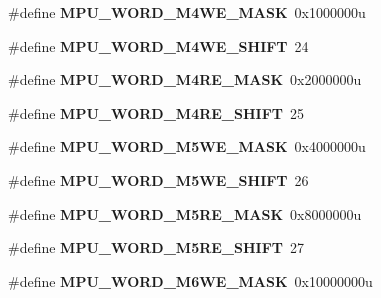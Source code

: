 \begin{DoxyCompactItemize}
\item 
\#define {\bfseries M\+P\+U\+\_\+\+W\+O\+R\+D\+\_\+\+M4\+W\+E\+\_\+\+M\+A\+SK}~0x1000000u\hypertarget{group__MPU__Register__Masks_gac3a983687d94df3019c562fa26c8d07e}{}\label{group__MPU__Register__Masks_gac3a983687d94df3019c562fa26c8d07e}

\item 
\#define {\bfseries M\+P\+U\+\_\+\+W\+O\+R\+D\+\_\+\+M4\+W\+E\+\_\+\+S\+H\+I\+FT}~24\hypertarget{group__MPU__Register__Masks_gaa32f6731588dff2a7e5ee20e10a86937}{}\label{group__MPU__Register__Masks_gaa32f6731588dff2a7e5ee20e10a86937}

\item 
\#define {\bfseries M\+P\+U\+\_\+\+W\+O\+R\+D\+\_\+\+M4\+R\+E\+\_\+\+M\+A\+SK}~0x2000000u\hypertarget{group__MPU__Register__Masks_ga529413212f8c7cf7bd2d1ab6a050d1c8}{}\label{group__MPU__Register__Masks_ga529413212f8c7cf7bd2d1ab6a050d1c8}

\item 
\#define {\bfseries M\+P\+U\+\_\+\+W\+O\+R\+D\+\_\+\+M4\+R\+E\+\_\+\+S\+H\+I\+FT}~25\hypertarget{group__MPU__Register__Masks_ga72594f986e13433ed74e6eabfacf5253}{}\label{group__MPU__Register__Masks_ga72594f986e13433ed74e6eabfacf5253}

\item 
\#define {\bfseries M\+P\+U\+\_\+\+W\+O\+R\+D\+\_\+\+M5\+W\+E\+\_\+\+M\+A\+SK}~0x4000000u\hypertarget{group__MPU__Register__Masks_ga918f8ced0f8de1a54cc59c57328a18f3}{}\label{group__MPU__Register__Masks_ga918f8ced0f8de1a54cc59c57328a18f3}

\item 
\#define {\bfseries M\+P\+U\+\_\+\+W\+O\+R\+D\+\_\+\+M5\+W\+E\+\_\+\+S\+H\+I\+FT}~26\hypertarget{group__MPU__Register__Masks_gaa25703033160cedcbc90416722c87fc9}{}\label{group__MPU__Register__Masks_gaa25703033160cedcbc90416722c87fc9}

\item 
\#define {\bfseries M\+P\+U\+\_\+\+W\+O\+R\+D\+\_\+\+M5\+R\+E\+\_\+\+M\+A\+SK}~0x8000000u\hypertarget{group__MPU__Register__Masks_ga04e6c19c601a7bd3dd87a889f309a9f4}{}\label{group__MPU__Register__Masks_ga04e6c19c601a7bd3dd87a889f309a9f4}

\item 
\#define {\bfseries M\+P\+U\+\_\+\+W\+O\+R\+D\+\_\+\+M5\+R\+E\+\_\+\+S\+H\+I\+FT}~27\hypertarget{group__MPU__Register__Masks_gaa33945bb1d9469089a504d285a8dc021}{}\label{group__MPU__Register__Masks_gaa33945bb1d9469089a504d285a8dc021}

\item 
\#define {\bfseries M\+P\+U\+\_\+\+W\+O\+R\+D\+\_\+\+M6\+W\+E\+\_\+\+M\+A\+SK}~0x10000000u\hypertarget{group__MPU__Register__Masks_ga954333596403a1acfee73052cb5ea1f9}{}\label{group__MPU__Register__Masks_ga954333596403a1acfee73052cb5ea1f9}


\end{DoxyCompactItemize}
